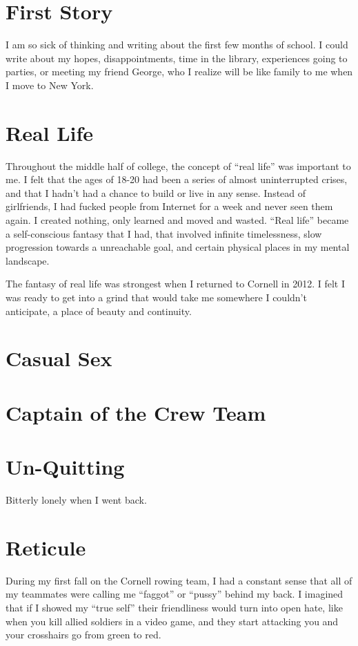 \documentclass[12pt]{article}
\begin{document}
\section{First Story}
I am so sick of thinking and writing about the first few months of school.  I
could write about my hopes, disappointments, time in the library, experiences
going to parties, or meeting my friend George, who I realize will be like family
to me when I move to New York. 




\section{Real Life}
Throughout the middle half of college, the concept of ``real life'' was
important to me.  I felt that the ages of 18-20 had been a series of almost
uninterrupted crises, and that I hadn't had a chance to build or live in any
sense.  Instead of girlfriends, I had fucked people from Internet for a week and
never seen them again.  I created nothing, only learned and moved and wasted.
``Real life'' became a self-conscious fantasy that I had, that involved infinite
timelessness, slow progression towards a unreachable goal, and certain physical
places in my mental landscape.

The fantasy of real life was strongest when I returned to Cornell in 2012.
I felt I was ready to get into a grind that would take me somewhere I couldn't
anticipate, a place of beauty and continuity.  

\section{Casual Sex}

\section{Captain of the Crew Team}

\section{Un-Quitting}
Bitterly lonely when I went back.

\section{Reticule}
During my first fall on the Cornell rowing team, I had a constant sense that
all of my teammates were calling me ``faggot'' or ``pussy'' behind my back.  I
imagined that if I showed my ``true self'' their friendliness would turn into
open hate, like when you kill allied soldiers in a video game, and they start
attacking you and your crosshairs go from green to red.  
\end{document}
